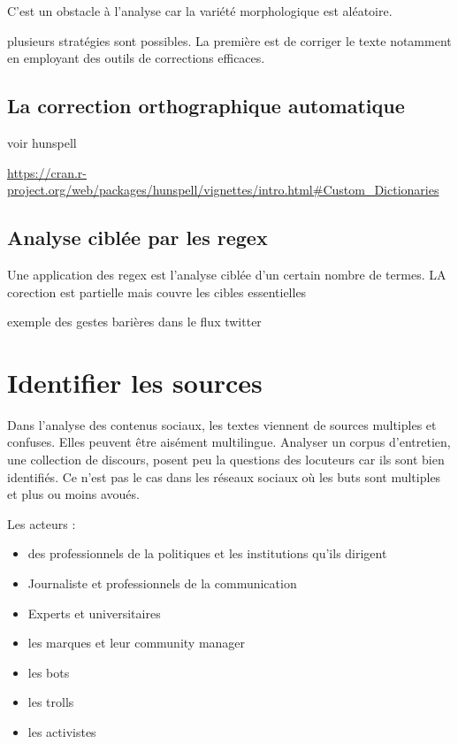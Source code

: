 \documentclass[
]{book}
\providecommand{\tightlist}{%
  \setlength{\itemsep}{0pt}\setlength{\parskip}{0pt}}
\begin{document}
C'est un obstacle à l'analyse car la variété morphologique est aléatoire.

plusieurs stratégies sont possibles. La première est de corriger le texte notamment en employant des outils de corrections efficaces.

\hypertarget{la-correction-orthographique-automatique}{%
\subsection{La correction orthographique automatique}\label{la-correction-orthographique-automatique}}

voir hunspell

\url{https://cran.r-project.org/web/packages/hunspell/vignettes/intro.html\#Custom_Dictionaries}

\hypertarget{analyse-cibluxe9e-par-les-regex}{%
\subsection{Analyse ciblée par les regex}\label{analyse-cibluxe9e-par-les-regex}}

Une application des regex est l'analyse ciblée d'un certain nombre de termes. LA corection est partielle mais couvre les cibles essentielles

exemple des gestes barières dans le flux twitter

\hypertarget{identifier-les-sources}{%
\section{Identifier les sources}\label{identifier-les-sources}}

Dans l'analyse des contenus sociaux, les textes viennent de sources multiples et confuses. Elles peuvent être aisément multilingue. Analyser un corpus d'entretien, une collection de discours, posent peu la questions des locuteurs car ils sont bien identifiés. Ce n'est pas le cas dans les réseaux sociaux où les buts sont multiples et plus ou moins avoués.

Les acteurs :

\begin{itemize}
\tightlist
\item
  des professionnels de la politiques et les institutions qu'ils dirigent
\item
  Journaliste et professionnels de la communication
\item
  Experts et universitaires
\item
  les marques et leur community manager
\item
  les bots
\item
  les trolls
\item
  les activistes
\end{itemize}
\end{document}
